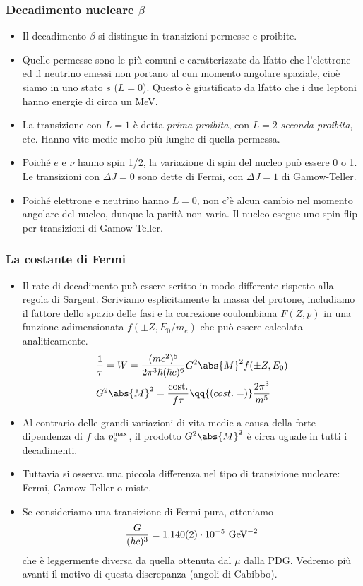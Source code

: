 \subsubsection{Decadimento nucleare $\beta$}
\begin{itemize}
    \item Il decadimento $\beta$ si distingue in transizioni permesse e proibite.
    \item Quelle permesse sono le più comuni e caratterizzate da lfatto che l'elettrone ed il neutrino emessi non portano al cun momento angolare spaziale, cioè siamo in uno stato $s$ ($L=0$). Questo è giustificato da lfatto che i due leptoni hanno energie di circa un MeV.
    \item La transizione con $L=1$ è detta \textit{prima proibita}, con $L=2$ \textit{seconda proibita}, etc. Hanno vite medie molto più lunghe di quella permessa.
    \item Poiché $e$ e $\nu$ hanno spin 1/2, la variazione di spin del nucleo può essere 0 o 1. Le transizioni con $\Delta J=0$ sono dette di Fermi, con $\Delta J=1$ di Gamow-Teller.
    \item Poiché elettrone e neutrino hanno $L=0$, non c'è alcun cambio nel momento angolare del nucleo, dunque la parità non varia. Il nucleo esegue uno spin flip per transizioni di Gamow-Teller.
\end{itemize}
\subsubsection{La costante di Fermi}
\begin{itemize}
    \item Il rate di decadimento può essere scritto in modo differente rispetto alla regola di Sargent. Scriviamo esplicitamente la massa del protone, includiamo il fattore dello spazio delle fasi e la correzione coulombiana $F(Z,p)$ in una funzione adimensionata $f(\pm Z,E_0/m_e)$ che può essere calcolata analiticamente.
    \begin{align*}
    &\frac{1}{\tau}=W=\frac{(mc^2)^5}{2\pi^3\hbar(\hbar c)^6}G^2\abs{M}^2f(\pm Z,E_0)\\
    & G^2\abs{M}^2=\frac{\textnormal{cost.}}{f\tau}\qq{(cost.=)}\frac{2\pi^3}{m^5}
    \end{align*}
    \item Al contrario delle grandi variazioni di vita medie a causa della forte dipendenza di $f$ da $p_e^{\textnormal{max}}$, il prodotto $G^2\abs{M}^2$ è circa uguale in tutti i decadimenti.
    \item Tuttavia si osserva una piccola differenza nel tipo di transizione nucleare: Fermi, Gamow-Teller o miste.
    \item Se consideriamo una transizione di Fermi pura, otteniamo
    \begin{equation*}
    \frac{G}{(\hbar c)^3}=1.140(2)\cdot10^{-5}\textnormal{ GeV}^{-2}
    \end{equation*}
    che è leggermente diversa da quella ottenuta dal $\mu$ dalla PDG. Vedremo più avanti il motivo di questa discrepanza (angoli di Cabibbo).
\end{itemize}

